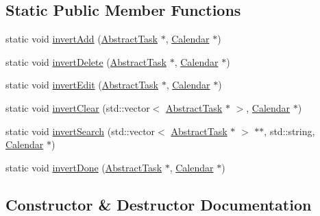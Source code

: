 \subsection*{Static Public Member Functions}
\begin{DoxyCompactItemize}
\item 
static void \hyperlink{class_do_lah_1_1_calendar_inverter_a71af02c5cdcb6904417eebffd45e3f80}{invert\+Add} (\hyperlink{class_do_lah_1_1_abstract_task}{Abstract\+Task} $\ast$, \hyperlink{class_do_lah_1_1_calendar}{Calendar} $\ast$)
\item 
static void \hyperlink{class_do_lah_1_1_calendar_inverter_ae7b5c92a949dd2cb90954fd0814fd575}{invert\+Delete} (\hyperlink{class_do_lah_1_1_abstract_task}{Abstract\+Task} $\ast$, \hyperlink{class_do_lah_1_1_calendar}{Calendar} $\ast$)
\item 
static void \hyperlink{class_do_lah_1_1_calendar_inverter_a1468dfb88afb3346c2d29c74989003e1}{invert\+Edit} (\hyperlink{class_do_lah_1_1_abstract_task}{Abstract\+Task} $\ast$, \hyperlink{class_do_lah_1_1_calendar}{Calendar} $\ast$)
\item 
static void \hyperlink{class_do_lah_1_1_calendar_inverter_a3bf514450b1fab9e0ec206eb093825c2}{invert\+Clear} (std\+::vector$<$ \hyperlink{class_do_lah_1_1_abstract_task}{Abstract\+Task} $\ast$ $>$, \hyperlink{class_do_lah_1_1_calendar}{Calendar} $\ast$)
\item 
static void \hyperlink{class_do_lah_1_1_calendar_inverter_ae7c3a5818d21c568863abe36d3ba54a8}{invert\+Search} (std\+::vector$<$ \hyperlink{class_do_lah_1_1_abstract_task}{Abstract\+Task} $\ast$ $>$ $\ast$$\ast$, std\+::string, \hyperlink{class_do_lah_1_1_calendar}{Calendar} $\ast$)
\item 
static void \hyperlink{class_do_lah_1_1_calendar_inverter_a74bc7a028c9a7eb2567fb3bb1c5975e2}{invert\+Done} (\hyperlink{class_do_lah_1_1_abstract_task}{Abstract\+Task} $\ast$, \hyperlink{class_do_lah_1_1_calendar}{Calendar} $\ast$)
\end{DoxyCompactItemize}


\subsection{Constructor \& Destructor Documentation}
\hypertarget{class_do_lah_1_1_calendar_inverter_a51fb3dc56d04563676901b50f72c2dc6}{}
